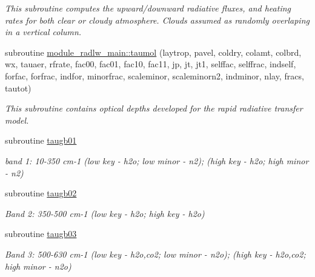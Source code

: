 \begin{DoxyCompactItemize}
\begin{DoxyCompactList}\small\item\em This subroutine computes the upward/downward radiative fluxes, and heating rates for both clear or cloudy atmosphere. Clouds assumed as randomly overlaping in a vertical column. \end{DoxyCompactList}\item 
subroutine \hyperlink{group__module__radlw__main_gab09f986fb87e796a30c889086c92aeb1}{module\+\_\+radlw\+\_\+main\+::taumol} (laytrop, pavel, coldry, colamt, colbrd, wx, tauaer, rfrate, fac00, fac01, fac10, fac11, jp, jt, jt1, selffac, selffrac, indself, forfac, forfrac, indfor, minorfrac, scaleminor, scaleminorn2, indminor, nlay, fracs, tautot)
\begin{DoxyCompactList}\small\item\em This subroutine contains optical depths developed for the rapid radiative transfer model. \end{DoxyCompactList}\item 
subroutine \hyperlink{group__module__radlw__main_ga001d1bcd17533f7f920f859ff9a4e60f}{taugb01}
\begin{DoxyCompactList}\small\item\em band 1\+: 10-\/350 cm-\/1 (low key -\/ h2o; low minor -\/ n2); (high key -\/ h2o; high minor -\/ n2) \end{DoxyCompactList}\item 
\mbox{\label{radlw__main_8f_a926415cb51870dda9a90883e01a2ee38}} 
subroutine \hyperlink{radlw__main_8f_a926415cb51870dda9a90883e01a2ee38}{taugb02}
\begin{DoxyCompactList}\small\item\em Band 2\+: 350-\/500 cm-\/1 (low key -\/ h2o; high key -\/ h2o) \end{DoxyCompactList}\item 
\mbox{\label{radlw__main_8f_a45e39b507d1fc031c80d9c7f06905d4a}} 
subroutine \hyperlink{radlw__main_8f_a45e39b507d1fc031c80d9c7f06905d4a}{taugb03}
\begin{DoxyCompactList}\small\item\em Band 3\+: 500-\/630 cm-\/1 (low key -\/ h2o,co2; low minor -\/ n2o); (high key -\/ h2o,co2; high minor -\/ n2o) \end{DoxyCompactList}\item 
\mbox{\label{radlw__main_8f_ae69174bcf1a87dc7a5baffac69797d07}} 

\end{DoxyCompactItemize}
